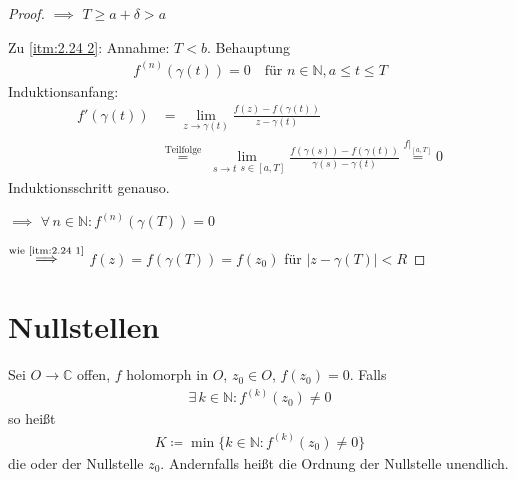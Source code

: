 \documentclass[a4paper,10pt]{scrbook}
\begin{document}
\begin{theorem}[Satz]
\begin{proof}
    $\implies$ $T \geq a + \delta > a$

    Zu \ref{itm:2.24 2}: Annahme: $T < b$. Behauptung
    \begin{align*}
      f^{(n)} (\gamma(t)) = 0 \quad \text{für } n \in \mathbb{N}, a \leq t \leq T
    \end{align*}
    Induktionsanfang:
    \begin{align*}
      f'(\gamma(t)) &= \lim\limits_{z \to \gamma(t)} \frac{f(z) - f(\gamma(t))}{z - \gamma(t)} \\
      &\overset{\text{Teilfolge}}{=} \lim\limits_{\substack{s \to t}{s \in [a,T]}} \frac{f(\gamma(s)) - f(\gamma(t))}{\gamma(s) - \gamma(t)} \overset{f|_{[a,T]}}{=} 0
    \end{align*}
    Induktionsschritt genauso.

    $\implies$ $\forall \, n \in \mathbb{N} : f^{(n)}(\gamma(T)) = 0$

    $\overset{\text{wie \ref{itm:2.24 1}}}{\implies}$ $f(z) = f(\gamma(T)) = f(z_0)$ für $|z-\gamma(T)| < R$
  \end{proof}
\end{theorem}

%
%

\section{Nullstellen}
\addtocounter{thmn}{1}
\setcounter{theorem}{0}


\begin{theorem}[Defintion]
  Sei $O \to \mathbb{C}$ offen, $f$ holomorph in $O$, $z_0 \in O$, $f(z_0)=0$. Falls
  \begin{align*}
    \exists \, k \in \mathbb{N} : f^{(k)}(z_0) \neq 0
  \end{align*}
  so heißt
  \begin{align*}
    K \coloneq \min \{ k \in \mathbb{N} : f^{(k)}(z_0) \neq 0 \}
  \end{align*}
  die  oder  der Nullstelle $z_0$. Andernfalls heißt die Ordnung der Nullstelle unendlich.
\end{theorem}
\end{document}

